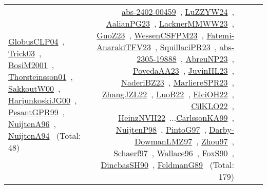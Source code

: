 {\begin{longtable}{p{3cm}r>{\raggedright\arraybackslash}p{6cm}>{\raggedright\arraybackslash}p{6cm}>{\raggedright\arraybackslash}p{8cm}}
\href{../works/GlobusCLP04.pdf}{GlobusCLP04}~\cite{GlobusCLP04}, \href{../works/Trick03.pdf}{Trick03}~\cite{Trick03}, \href{../works/BosiM2001.pdf}{BosiM2001}~\cite{BosiM2001}, \href{../works/Thorsteinsson01.pdf}{Thorsteinsson01}~\cite{Thorsteinsson01}, \href{../works/SakkoutW00.pdf}{SakkoutW00}~\cite{SakkoutW00}, \href{../works/HarjunkoskiJG00.pdf}{HarjunkoskiJG00}~\cite{HarjunkoskiJG00}, \href{../works/PesantGPR99.pdf}{PesantGPR99}~\cite{PesantGPR99}, \href{../works/NuijtenA96.pdf}{NuijtenA96}~\cite{NuijtenA96}, \href{../works/NuijtenA94.pdf}{NuijtenA94}~\cite{NuijtenA94} (Total: 48) & \href{../works/abs-2402-00459.pdf}{abs-2402-00459}~\cite{abs-2402-00459}, \href{../works/LuZZYW24.pdf}{LuZZYW24}~\cite{LuZZYW24}, \href{../works/AalianPG23.pdf}{AalianPG23}~\cite{AalianPG23}, \href{../works/LacknerMMWW23.pdf}{LacknerMMWW23}~\cite{LacknerMMWW23}, \href{../works/GuoZ23.pdf}{GuoZ23}~\cite{GuoZ23}, \href{../works/WessenCSFPM23.pdf}{WessenCSFPM23}~\cite{WessenCSFPM23}, \href{../works/Fatemi-AnarakiTFV23.pdf}{Fatemi-AnarakiTFV23}~\cite{Fatemi-AnarakiTFV23}, \href{../works/SquillaciPR23.pdf}{SquillaciPR23}~\cite{SquillaciPR23}, \href{../works/abs-2305-19888.pdf}{abs-2305-19888}~\cite{abs-2305-19888}, \href{../works/AbreuNP23.pdf}{AbreuNP23}~\cite{AbreuNP23}, \href{../works/PovedaAA23.pdf}{PovedaAA23}~\cite{PovedaAA23}, \href{../works/JuvinHL23.pdf}{JuvinHL23}~\cite{JuvinHL23}, \href{../works/NaderiBZ23.pdf}{NaderiBZ23}~\cite{NaderiBZ23}, \href{../works/MarliereSPR23.pdf}{MarliereSPR23}~\cite{MarliereSPR23}, \href{../works/ZhangJZL22.pdf}{ZhangJZL22}~\cite{ZhangJZL22}, \href{../works/LuoB22.pdf}{LuoB22}~\cite{LuoB22}, \href{../works/ElciOH22.pdf}{ElciOH22}~\cite{ElciOH22}, \href{../works/CilKLO22.pdf}{CilKLO22}~\cite{CilKLO22}, \href{../works/HeinzNVH22.pdf}{HeinzNVH22}~\cite{HeinzNVH22}...\href{../works/CarlssonKA99.pdf}{CarlssonKA99}~\cite{CarlssonKA99}, \href{../works/NuijtenP98.pdf}{NuijtenP98}~\cite{NuijtenP98}, \href{../works/PintoG97.pdf}{PintoG97}~\cite{PintoG97}, \href{../works/Darby-DowmanLMZ97.pdf}{Darby-DowmanLMZ97}~\cite{Darby-DowmanLMZ97}, \href{../works/Zhou97.pdf}{Zhou97}~\cite{Zhou97}, \href{../works/Schaerf97.pdf}{Schaerf97}~\cite{Schaerf97}, \href{../works/Wallace96.pdf}{Wallace96}~\cite{Wallace96}, \href{../works/FoxS90.pdf}{FoxS90}~\cite{FoxS90}, \href{../works/DincbasSH90.pdf}{DincbasSH90}~\cite{DincbasSH90}, \href{../works/FeldmanG89.pdf}{FeldmanG89}~\cite{FeldmanG89} (Total: 179)\\

\end{longtable}}
